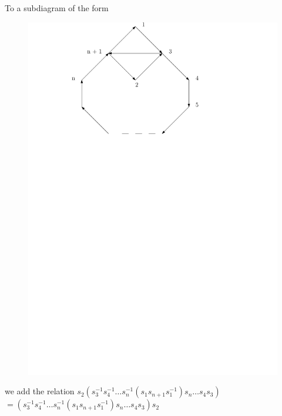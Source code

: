 \documentclass{beamer}
\begin{document}
\begin{frame}
To a subdiagram of the form
\begin{figure}
\includegraphics[scale = .50]{Diagram2.pdf}
\end{figure}
we add the relation
$s_{2}(s_{3}^{-1}s_{4}^{-1}\dots s_{n}^{-1}(s_{1}s_{n+1}s_{1}^{-1})s_{n} \dots s_{4}s_{3})$
\newline $= (s_{3}^{-1}s_{4}^{-1}\dots s_{n}^{-1}(s_{1}s_{n+1}s_{1}^{-1})s_{n} \dots s_{4}s_{3})s_{2}$
\end{frame}
\end{document}
